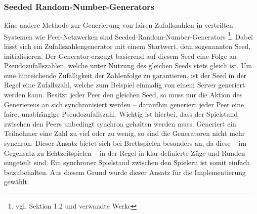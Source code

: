 \subsubsection{Seeded Random-Number-Generators}
Eine andere Methode zur Generierung von fairen Zufallszahlen in verteilten Systemen wie Peer-Netzwerken sind \glqq{}Seeded-Random-Number-Generators\grqq{}  \cite{rng}\footnote{vgl. Sektion 1.2 und verwandte Werke}. Dabei lässt sich ein Zufallszahlengenerator mit einem Startwert, dem sogenannten \glqq{}Seed\grqq{}, initialisieren. Der Generator erzeugt basierend auf diesem Seed eine Folge an Pseudozufallszahlen, welche unter Nutzung des gleichen Seeds stets gleich ist. Um eine hinreichende Zufälligkeit der Zahlenfolge zu garantieren, ist der Seed in der Regel eine Zufallszahl, welche zum Beispiel einmalig von einem Server generiert werden kann. Besitzt jeder Peer den gleichen Seed, so muss nur die Aktion des Generierens an sich synchronisiert werden -- daraufhin generiert jeder Peer eine faire, unabhängige Pseudozufallszahl. Wichtig ist hierbei, dass der Spielstand zwischen den Peers unbedingt synchron gehalten werden muss. Generiert ein Teilnehmer eine Zahl zu viel oder zu wenig, so sind die Generatoren nicht mehr synchron. Dieser Ansatz bietet sich bei Brettspielen besonders an, da diese -- im Gegensatz zu Echtzeitspielen -- in der Regel in klar definierte \glqq{}Züge\grqq{} und \glqq{}Runden\grqq{} eingeteilt sind. Ein synchroner Spielstand zwischen den Spielern ist somit einfach beizubehalten. Aus diesem Grund wurde dieser Ansatz für die Implementierung gewählt.\par


